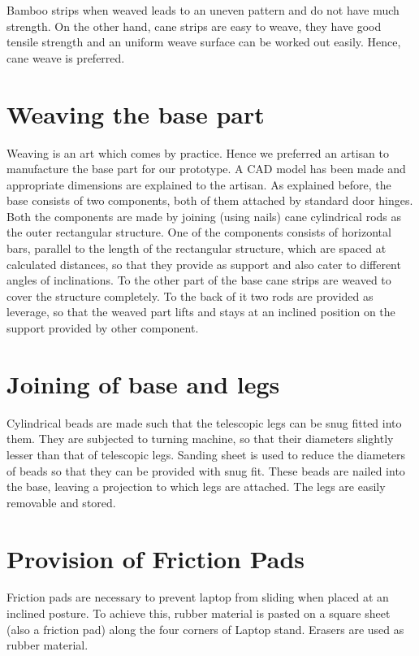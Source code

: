 Bamboo strips when weaved leads to an uneven pattern and do not have much strength. On the other hand, cane strips are easy to weave, they have good tensile strength and an uniform weave surface can be worked out easily. Hence, cane weave is preferred.

\section{Weaving the base part}

Weaving is an art which comes by practice. Hence we preferred an artisan to manufacture the base part for our prototype. A CAD model has been made and appropriate dimensions are explained to the artisan. 
As explained before, the base consists of two components, both of them attached by standard door hinges. Both the components are made by joining (using nails) cane cylindrical rods as the outer rectangular structure. One of the components consists of  horizontal bars, parallel to the length of the rectangular structure, which are spaced at calculated distances, so that they provide as support and also cater to different angles of inclinations. To the other part of the base cane strips are weaved to cover the structure completely. To the back of it two rods are provided as leverage, so that the weaved part lifts and stays at an inclined position on the support provided by other component. 

\section{Joining of base and legs}

Cylindrical beads are made such that the telescopic legs can be snug fitted into them. They are subjected to turning machine, so that their diameters slightly lesser than that of telescopic legs. Sanding sheet is used to reduce the diameters of beads so that they can be provided with snug fit. These beads are nailed into the base, leaving a projection to which legs are attached. The legs are easily removable and stored. 

\section{Provision of Friction Pads}
Friction pads are necessary to prevent laptop from sliding when placed at an inclined posture. To achieve this, rubber material is pasted on a square sheet (also a friction pad) along the four corners of Laptop stand. Erasers are used as rubber material.

